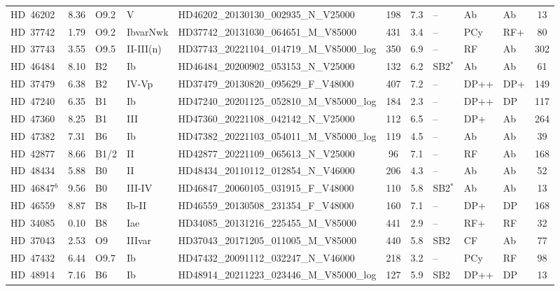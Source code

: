 {\begin{landscape}
\begin{longtable}{lclllcclllc}
\noalign{\smallskip}
HD~46202 & 8.36 & O9.2 & V & HD46202\_20130130\_002935\_N\_V25000 & 198 & 7.3 & -- & Ab & Ab & 13 \\
\noalign{\smallskip}
HD~37742 & 1.79 & O9.2 & IbvarNwk & HD37742\_20131030\_064651\_M\_V85000 & 431 & 3.4 & -- & PCy & RF+ & 80 \\
\noalign{\smallskip}
HD~37743 & 3.55 & O9.5 & II-III(n) & HD37743\_20221104\_014719\_M\_V85000\_log & 350 & 6.9 & -- & RF & Ab & 302 \\
\noalign{\smallskip}
HD~46484 & 8.10 & B2 & Ib & HD46484\_20200902\_053153\_N\_V25000 & 132 & 6.2 & SB2$^{*}$ & Ab & Ab & 61 \\
\noalign{\smallskip}
HD~37479 & 6.38 & B2 & IV-Vp & HD37479\_20130820\_095629\_F\_V48000 & 407 & 7.2 & -- & DP++ & DP+ & 149 \\
\noalign{\smallskip}
HD~47240 & 6.35 & B1 & Ib & HD47240\_20201125\_052810\_M\_V85000\_log & 184 & 2.3 & -- & DP++ & DP & 117 \\
\noalign{\smallskip}
HD~47360 & 8.25 & B1 & III & HD47360\_20221108\_042142\_N\_V25000 & 112 & 6.5 & -- & DP+ & Ab & 264 \\
\noalign{\smallskip}
HD~47382 & 7.31 & B6 & Ib & HD47382\_20221103\_054011\_M\_V85000\_log & 119 & 4.5 & -- & Ab & Ab & 39 \\
\noalign{\smallskip}
HD~42877 & 8.66 & B1/2 & II & HD42877\_20221109\_065613\_N\_V25000 & 96 & 7.1 & -- & RF & Ab & 168 \\
\noalign{\smallskip}
HD~48434 & 5.88 & B0 & II & HD48434\_20110112\_012854\_N\_V46000 & 206 & 4.3 & -- & Ab & Ab & 52 \\
\noalign{\smallskip}
HD~46847$^{b}$ & 9.56 & B0 & III-IV & HD46847\_20060105\_031915\_F\_V48000 & 110 & 5.8 & SB2$^{*}$ & Ab & Ab & 13 \\
\noalign{\smallskip}
HD~46559 & 8.87 & B8 & Ib-II & HD46559\_20130508\_231354\_F\_V48000 & 160 & 7.1 & -- & DP+ & DP & 168 \\
\noalign{\smallskip}
HD~34085 & 0.10 & B8 & Iae & HD34085\_20131216\_225455\_M\_V85000 & 441 & 2.9 & -- & RF+ & RF & 32 \\
\noalign{\smallskip}
HD~37043 & 2.53 & O9 & IIIvar & HD37043\_20171205\_011005\_M\_V85000 & 440 & 5.8 & SB2 & CF & Ab & 77 \\
\noalign{\smallskip}
HD~47432 & 6.44 & O9.7 & Ib & HD47432\_20091112\_032247\_N\_V46000 & 218 & 3.2 & -- & PCy & RF & 98 \\
\noalign{\smallskip}
HD~48914 & 7.16 & B6 & Ib & HD48914\_20211223\_023446\_M\_V85000\_log & 127 & 5.9 & SB2 & DP++ & DP & 13 \\

\end{longtable}
\end{landscape}}
